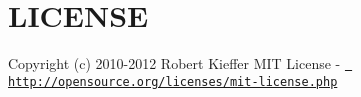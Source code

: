 \chapter{LICENSE}
\hypertarget{md__c_1_2_users_2_s_t_r_i_d_e_r_2source_2repos_2_ainslie_a_p_i_2wwwroot_2lib_2jquery-ui_2node__ma4c1229792523a5ed0b4f031323ff0c8}{}\label{md__c_1_2_users_2_s_t_r_i_d_e_r_2source_2repos_2_ainslie_a_p_i_2wwwroot_2lib_2jquery-ui_2node__ma4c1229792523a5ed0b4f031323ff0c8}
Copyright (c) 2010-\/2012 Robert Kieffer MIT License -\/ \href{http://opensource.org/licenses/mit-license.php}{\texttt{ http\+://opensource.\+org/licenses/mit-\/license.\+php}} 